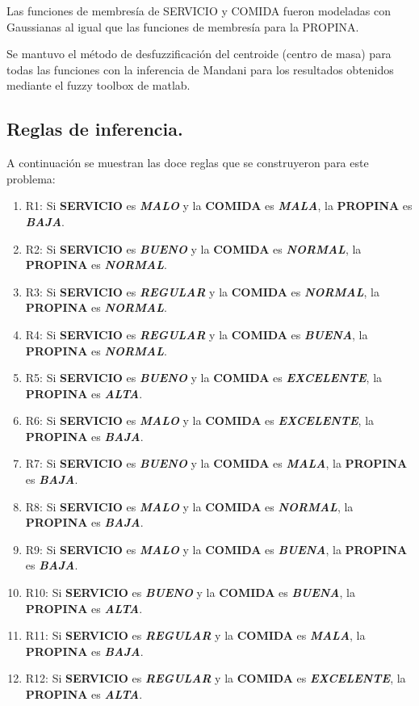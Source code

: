 \documentclass[11pt, letterpaper]{article}
\begin{document}
Las funciones de membresía de SERVICIO y COMIDA fueron modeladas con Gaussianas al igual que las funciones de membresía para la PROPINA.

Se mantuvo el método de desfuzzificación del centroide (centro de masa) para todas las funciones con la inferencia de Mandani para los resultados obtenidos mediante el fuzzy toolbox de matlab.\\

\newpage

\subsection{Reglas de inferencia.}

A continuación se muestran las doce reglas que se construyeron para este problema:

\begin{enumerate}
	\item R1: Si \textbf{SERVICIO} es \textbf{\textit{MALO}} y la \textbf{COMIDA} es \textbf{\textit{MALA}}, la \textbf{PROPINA} es \textbf{\textit{BAJA}}.
	\item R2: Si \textbf{SERVICIO} es \textbf{\textit{BUENO}} y la \textbf{COMIDA} es \textbf{\textit{NORMAL}}, la \textbf{PROPINA} es \textbf{\textit{NORMAL}}.
	\item R3: Si \textbf{SERVICIO} es \textbf{\textit{REGULAR}} y la \textbf{COMIDA} es \textbf{\textit{NORMAL}}, la \textbf{PROPINA} es \textbf{\textit{NORMAL}}.
	\item R4: Si \textbf{SERVICIO} es \textbf{\textit{REGULAR}} y la \textbf{COMIDA} es \textbf{\textit{BUENA}}, la \textbf{PROPINA} es \textbf{\textit{NORMAL}}.
	\item R5: Si \textbf{SERVICIO} es \textbf{\textit{BUENO}} y la \textbf{COMIDA} es \textbf{\textit{EXCELENTE}}, la \textbf{PROPINA} es \textbf{\textit{ALTA}}.
	\item R6: Si \textbf{SERVICIO} es \textbf{\textit{MALO}} y la \textbf{COMIDA} es \textbf{\textit{EXCELENTE}}, la \textbf{PROPINA} es \textbf{\textit{BAJA}}.
	\item R7: Si \textbf{SERVICIO} es \textbf{\textit{BUENO}} y la \textbf{COMIDA} es \textbf{\textit{MALA}}, la \textbf{PROPINA} es \textbf{\textit{BAJA}}.
	\item R8: Si \textbf{SERVICIO} es \textbf{\textit{MALO}} y la \textbf{COMIDA} es \textbf{\textit{NORMAL}}, la \textbf{PROPINA} es \textbf{\textit{BAJA}}.
	\item R9: Si \textbf{SERVICIO} es \textbf{\textit{MALO}} y la \textbf{COMIDA} es \textbf{\textit{BUENA}}, la \textbf{PROPINA} es \textbf{\textit{BAJA}}.
	\item R10: Si \textbf{SERVICIO} es \textbf{\textit{BUENO}} y la \textbf{COMIDA} es \textbf{\textit{BUENA}}, la \textbf{PROPINA} es \textbf{\textit{ALTA}}.
	\item R11: Si \textbf{SERVICIO} es \textbf{\textit{REGULAR}} y la \textbf{COMIDA} es \textbf{\textit{MALA}}, la \textbf{PROPINA} es \textbf{\textit{BAJA}}.
	\item R12: Si \textbf{SERVICIO} es \textbf{\textit{REGULAR}} y la \textbf{COMIDA} es \textbf{\textit{EXCELENTE}}, la \textbf{PROPINA} es \textbf{\textit{ALTA}}.
\end{enumerate}
\end{document}
